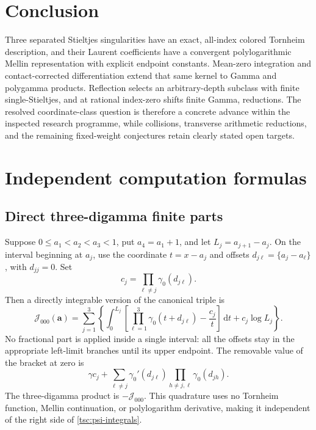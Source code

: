 \documentclass[11pt]{article}
\numberwithin{equation}{section}
\theoremstyle{definition}\newtheorem{definition}[theorem]{Definition}
\theoremstyle{remark}\newtheorem{remark}[theorem]{Remark}
\newcommand{\dd}{\,\mathrm d}
\newcommand{\calJ}{\mathcal J}
\begin{document}
\section*{Conclusion}
Three separated Stieltjes singularities have an exact, all-index colored
Tornheim description, and their Laurent coefficients have a convergent
polylogarithmic Mellin representation with explicit endpoint constants.
Mean-zero integration and contact-corrected differentiation extend that
same kernel to Gamma and polygamma products. Reflection selects an
arbitrary-depth subclass with finite single-Stieltjes, and at rational
index-zero shifts finite Gamma, reductions. The resolved coordinate-class
question is therefore a concrete advance within the inspected research
programme, while collisions, transverse arithmetic reductions, and the
remaining fixed-weight conjectures retain clearly stated open targets.


\appendix
\section{Independent computation formulas}\label{tsc:computation}
\subsection{Direct three-digamma finite parts}
Suppose $0\le a_1<a_2<a_3<1$, put $a_4=a_1+1$, and let
$L_j=a_{j+1}-a_j$. On the interval beginning at $a_j$, use the coordinate
$t=x-a_j$ and offsets $d_{j\ell}=\{a_j-a_\ell\}$, with $d_{jj}=0$.
Set
\[
 c_j=\prod_{\ell\ne j}\gamma_0(d_{j\ell}).
\]
Then a directly integrable version of the canonical triple is
\begin{equation}\label{tsc:direct-triple}
 \calJ_{000}(\mathbf a)=\sum_{j=1}^3\left\{
   \int_0^{L_j}\left[\prod_{\ell=1}^3\gamma_0(t+d_{j\ell})
                              -\frac{c_j}{t}\right]\dd t
                          +c_j\log L_j\right\}.
\end{equation}
No fractional part is applied inside a single interval: all the offsets
stay in the appropriate left-limit branches until its upper endpoint.
The removable value of the bracket at zero is
\[
 \gamma c_j+
  \sum_{\ell\ne j}\gamma_0'(d_{j\ell})
             \prod_{h\ne j,\ell}\gamma_0(d_{jh}).
\]
The three-digamma product is $-\calJ_{000}$. This quadrature uses no
Tornheim function, Mellin continuation, or polylogarithm derivative, making
it independent of the right side of \eqref{tsc:psi-integrals}.
\end{document}

